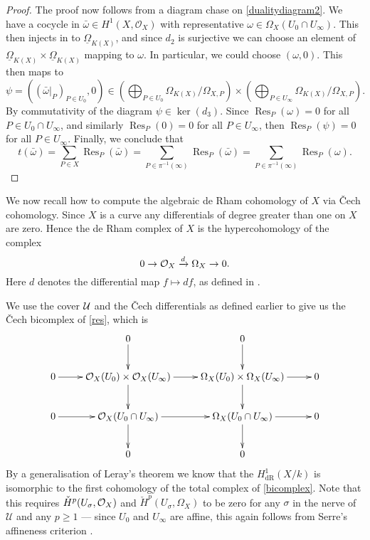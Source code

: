 \documentclass[draft, 11pt]{article} %
\theoremstyle{plain}
\theoremstyle{remark}
\newcommand{\cO}{{\cal O}}
\newcommand{\cU}{{\mathcal U}}
\newcommand{\cech}{\v{C}ech }
\newcommand{\hone}{H^1(X,\mathcal{O}_X)}
\newcommand{\derhamhone}{H_{\text {dR}}^1(X/k)}
\DeclareMathOperator{\res}{Res}
\begin{document}
\begin{proof}
The proof now follows from a diagram chase on \eqref{dualitydiagram2}.
 We have a cocycle in $\bar \omega \in \hone$ with representative $\omega \in \Omega_X(U_0 \cap U_\infty)$.
This then injects in to $\underline{\Omega}_{K(X)}$, and since $d_2$ is surjective we can choose an element of $\underline{\Omega}_{K(X)} \times \underline{\Omega}_{K(X)}$ mapping to $\omega$.
In particular, we could choose $(\omega,0)$.
This then maps to 
\[
\psi = ((\bar{\omega}|_P)_{P\in U_0}, 0) \in \left( \bigoplus_{P \in U_0} \Omega_{K(X)}/\Omega_{X,P}\right) \times \left( \bigoplus_{P \in U_\infty} \Omega_{K(X)}/\Omega_{X,P} \right).
\]
By commutativity of the diagram $\psi \in \ker(d_3)$.
Since $\res_P(\omega)=0$ for all $P \in U_0 \cap U_\infty$, and similarly $\res_P(0)=0$ for all $P \in U_\infty$, then $\res_P(\psi) = 0$ for all $P \in U_\infty$.
Finally, we conclude that 
\[
t(\bar \omega) = \sum_{P \in X}\res_P(\bar \omega) = \sum_{P \in \pi^{-1}(\infty)} \res_P(\bar \omega) = \sum_{P \in \pi^{-1}(\infty)} \res_P(\omega).
\]
\end{proof}

We now recall how to compute the algebraic de Rham cohomology of $X$ via \cech cohomology.
Since $X$ is a curve any differentials of degree greater than one on $X$ are zero.
Hence the de Rham complex of $X$ is the hypercohomology of the complex
\begin{equation}\label{res}
0 \rightarrow \cO_X \xrightarrow{d} \Omega_X \rightarrow 0.
\end{equation}
Here $d$ denotes the differential map $f \mapsto df$, as defined in \cite[Chap II, \S 8, Pg. 172]{hart}.

We use the cover $\cal U$ and the \cech differentials as defined earlier to give us the \cech bicomplex of \eqref{res}, which is
\begin{equation}\label{bicomplex}
\xymatrix{ & 0 \ar[d] & 0 \ar[d] & \\
0 \ar[r] & \cO_X(U_0) \times \cO_X(U_\infty) \ar[d] \ar[r] & \Omega_X(U_0) \times \Omega_X(U_\infty) \ar[d] \ar[r] & 0 \\
0 \ar[r] & \cO_X(U_0\cap U_\infty) \ar[d] \ar[r] & \Omega_X(U_0 \cap U_\infty) \ar[r] \ar[d] & 0 \\
& 0 & 0 &}
\end{equation}
By a generalisation of Leray's theorem \cite[Cor 12.4.7]{EGA0III} we know that the $\derhamhone$ is isomorphic to the first cohomology of the total complex of \eqref{bicomplex}.
Note that this requires ${\check H}^p(U_\sigma, \cO_X)$ and ${\check H}^p(U_\sigma, \Omega_X)$ to be zero for any $\sigma$ in the nerve of $\cU$ and any $p \geq 1$ ---
since $U_0$ and $U_\infty$ are affine, this again follows from Serre's affineness criterion \cite[Thm 5.2.23]{liu}.
\end{document}
